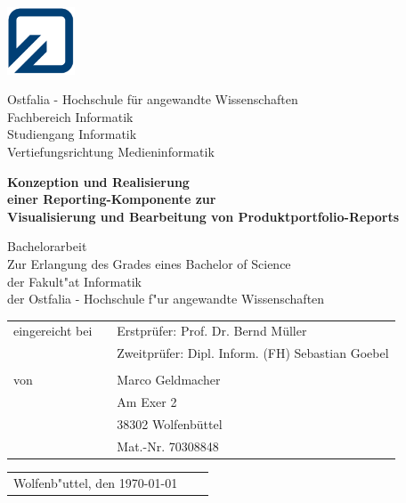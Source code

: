 
\begin{titlepage}

	\thispagestyle{empty}
	
	\begin{minipage}{2.1cm}
		\includegraphics[width=2cm]{grafiken/fh_logo_klein.jpg}
	\end{minipage}
	\begin{minipage}{10.0cm}
		Ostfalia - Hochschule für angewandte Wissenschaften\\
		Fachbereich Informatik\\
		Studiengang Informatik\\
		Vertiefungsrichtung Medieninformatik
	\end{minipage}

	\vspace{15mm}

	\begin{center}
		\LARGE \textbf{Konzeption und Realisierung \\einer Reporting-Komponente zur \\Visualisierung und Bearbeitung von Produktportfolio-Reports\\[10mm]}
	\end{center}
	
	\begin{center}
		\normalsize Bachelorarbeit\\[1cm]
		Zur Erlangung des Grades eines Bachelor of Science\\ 
		der Fakult"at Informatik\\
		der Ostfalia - Hochschule f"ur angewandte Wissenschaften\\[10mm]
	\end{center}

	\begin{table}[h]
		\centering
		\hspace{50mm}\begin{tabular}{lcl}
			eingereicht bei &  & Erstprüfer: Prof. Dr. Bernd Müller\\
			& & Zweitprüfer: Dipl. Inform. (FH) Sebastian Goebel \\
			& & \\
			von & & Marco Geldmacher\\
			& & Am Exer 2\\
			& & 38302 Wolfenbüttel\\
			& & Mat.-Nr. 70308848\\
		\end{tabular}
	\end{table}

	\vspace{20mm}

	\begin{table}[h]
		\begin{tabular}{lll}
			Wolfenb"uttel, den \today\\
		\end{tabular}
	\end{table}

\end{titlepage}
